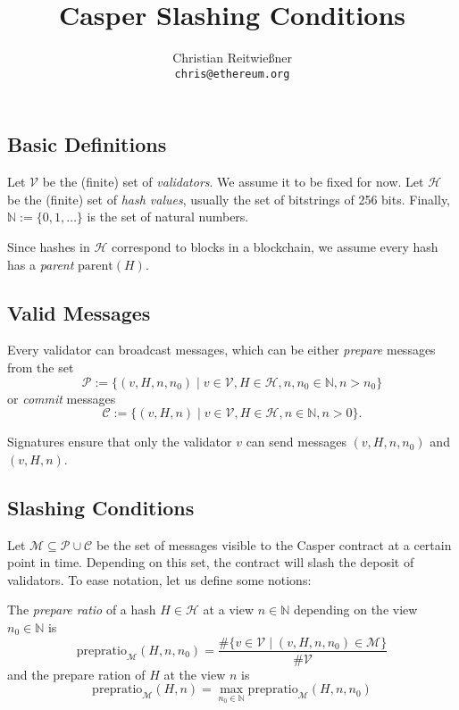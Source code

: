 \documentclass[11pt,letterpaper]{article}
\date{}
\newcommand{\uint}{\mathbb{N}}
\newcommand{\eqdef}{:=}
\newcommand{\validators}{\mathcal{V}}
\newcommand{\messages}{\mathcal{M}}
\begin{document}


\title{Casper Slashing Conditions}

\author{Christian Reitwießner \\
{\tt chris@ethereum.org}}


\maketitle

\subsection{Basic Definitions}

Let $\validators$ be the (finite) set of \emph{validators}. We assume it to be fixed
for now. Let $\mathcal{H}$ be the (finite) set of \emph{hash values}, usually
the set of bitstrings of 256 bits. Finally, $\uint \eqdef \{0, 1, \dots\}$
is the set of natural numbers.

Since hashes in $\mathcal{H}$ correspond to blocks in a blockchain, we assume every hash
has a \emph{parent} $\mathrm{parent}(H)$.

\subsection*{Valid Messages}

Every validator can broadcast messages, which can be either \emph{prepare} messages from
the set
\[
  \mathcal{P} \eqdef \{(v, H, n, n_0) \mid
  v \in \validators, H \in \mathcal{H}, n,n_0 \in \uint,
  n > n_0
  \}
\]
or \emph{commit} messages
\[
  \mathcal{C} \eqdef \{(v, H, n) \mid
  v \in \validators, H \in \mathcal{H}, n \in \uint, n > 0\}.
\]

Signatures ensure that only the validator $v$ can send messages $(v, H, n, n_0)$
and $(v, H, n)$.

\subsection*{Slashing Conditions}

Let $\messages \subseteq \mathcal{P} \cup \mathcal{C}$ be the set of messages
visible to the Casper contract at a certain point in time. Depending on
this set, the contract will slash the deposit of validators. To ease notation,
let us define some notions:

The \emph{prepare ratio} of a hash $H \in \mathcal{H}$ at a view $n \in \uint$ depending
on the view $n_0 \in \uint$ is
\[
\mathrm{prepratio}_{\messages}(H, n, n_0) =
\frac{\#\{v \in \validators \mid (v, H, n, n_0) \in \messages \}}{\#\validators}
\]
and the prepare ration of $H$ at the view $n$ is
\[
\mathrm{prepratio}_{\messages}(H, n) = \max_{n_0 \in \uint} \mathrm{prepratio}_\messages(H, n, n_0)
\]
\end{document}
